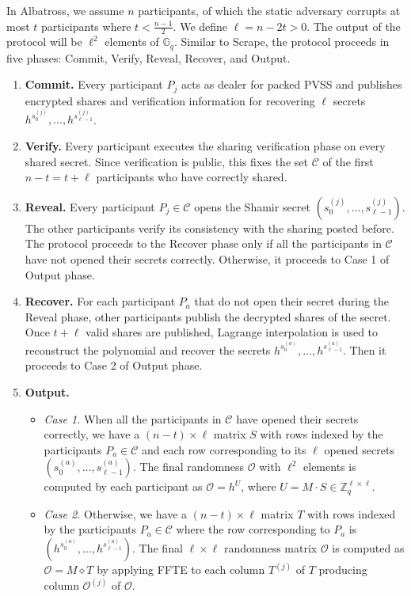 \documentclass[letterpaper,twocolumn,10pt]{article}
\theoremstyle{definition}
\theoremstyle{remark}
\begin{document}
In Albatross, we assume $n$ participants, of which the static adversary corrupts at most $t$ participants where $t < \frac{n - 1}{2}$. We define $\ell = n - 2t > 0$. The output of the protocol will be $\ell^2$ elements of $\mathbb{G}_q$. Similar to Scrape, the protocol proceeds in five phases: Commit, Verify, Reveal, Recover, and Output.
\begin{enumerate}
    \item \textbf{Commit.} Every participant $P_j$ acts as dealer for packed PVSS and publishes encrypted shares and verification information for recovering $\ell$ secrets $h^{s^{(j)}_{0}}, \ldots, h^{s^{(j)}_{\ell-1}}$.
    \item \textbf{Verify.} Every participant executes the sharing verification phase on every shared secret. Since verification is public, this fixes the set $\mathcal{C}$ of the first $n - t = t + \ell$ participants who have correctly shared.
    \item \textbf{Reveal.} Every participant $P_j \in \mathcal{C}$ opens the Shamir secret $(s^{(j)}_{0}, \ldots, s^{(j)}_{\ell-1})$. The other participants verify its consistency with the sharing posted before. The protocol proceeds to the Recover phase only if all the participants in $\mathcal{C}$ have not opened their secrets correctly. Otherwise, it proceeds to Case 1 of Output phase.
    \item \textbf{Recover.} For each participant $P_a$ that do not open their secret during the Reveal phase, other participants publish the decrypted shares of the secret. Once $t+\ell$ valid shares are published, Lagrange interpolation is used to reconstruct the polynomial and recover the secrets $h^{s^{(a)}_{0}}, \ldots, h^{s^{(a)}_{\ell-1}}$. Then it proceeds to Case 2 of Output phase.
    \item \textbf{Output.}
        \begin{itemize}
            \item \textit{Case 1.} When all the participants in $\mathcal{C}$ have opened their secrets correctly, we have a $(n-t) \times \ell$ matrix $S$ with rows indexed by the participants $P_a \in \mathcal{C}$ and each row corresponding to its $\ell$ opened secrets $(s^{(a)}_{0}, \ldots, s^{(a)}_{\ell-1})$. The final randomness $\mathcal{O}$ with $\ell^2$ elements is computed by each participant as $\mathcal{O} = h^U$, where $U = M \cdot S \in \mathbb{Z}_q^{\ell \times \ell}$.
            
            \item \textit{Case 2.} Otherwise, we have a $(n-t) \times \ell$ matrix $T$ with rows indexed by the participants $P_a \in \mathcal{C}$ where the row corresponding to $P_a$ is $(h^{s^{(a)}_{0}}, \ldots, h^{s^{(a)}_{\ell-1}})$. The final $\ell \times \ell$ randomness matrix $\mathcal{O}$ is computed as $\mathcal{O} = M \diamond T$ by applying FFTE to each column $T^{(j)}$ of $T$ producing column $\mathcal{O}^{(j)}$ of $\mathcal{O}$.
        \end{itemize}
\end{enumerate}
\end{document}
